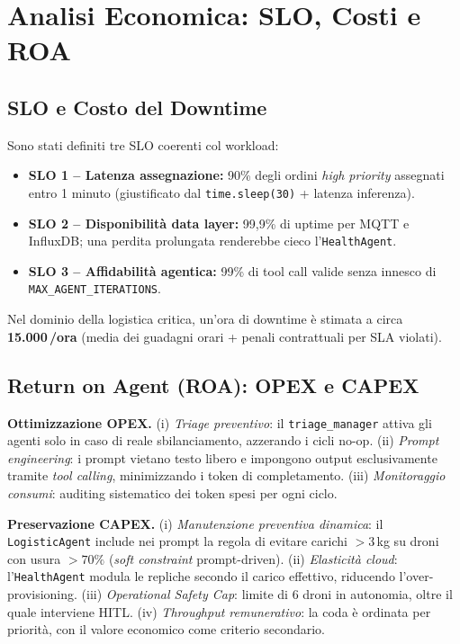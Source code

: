 
\chapter{Analisi Economica: SLO, Costi e ROA}
\label{cap:analisi_economica}

\section{SLO e Costo del Downtime}
\label{sec:slo_downtime}

Sono stati definiti tre SLO coerenti col workload:
\begin{itemize}
    \item \textbf{SLO 1 -- Latenza assegnazione:} 90\% degli ordini \textit{high priority} assegnati entro 1 minuto (giustificato dal \texttt{time.sleep(30)} + latenza inferenza).
    \item \textbf{SLO 2 -- Disponibilità data layer:} 99{,}9\% di uptime per MQTT e InfluxDB; una perdita prolungata renderebbe cieco l'\texttt{HealthAgent}.
    \item \textbf{SLO 3 -- Affidabilità agentica:} 99\% di tool call valide senza innesco di \texttt{MAX\_AGENT\_ITERATIONS}.
\end{itemize}

Nel dominio della logistica critica, un'ora di downtime è stimata a circa \textbf{15.000\,\texteuro/ora} (media dei guadagni orari + penali contrattuali per SLA violati).

\section{Return on Agent (ROA): OPEX e CAPEX}
\label{sec:roa}

\textbf{Ottimizzazione OPEX.} (i) \textit{Triage preventivo}: il \texttt{triage\_manager} attiva gli agenti solo in caso di reale sbilanciamento, azzerando i cicli no-op. (ii) \textit{Prompt engineering}: i prompt vietano testo libero e impongono output esclusivamente tramite \textit{tool calling}, minimizzando i token di completamento. (iii) \textit{Monitoraggio consumi}: auditing sistematico dei token spesi per ogni ciclo.

\textbf{Preservazione CAPEX.} (i) \textit{Manutenzione preventiva dinamica}: il \texttt{LogisticAgent} include nei prompt la regola di evitare carichi $>3$\,kg su droni con usura $>70\%$ (\textit{soft constraint} prompt-driven). (ii) \textit{Elasticità cloud}: l'\texttt{HealthAgent} modula le repliche secondo il carico effettivo, riducendo l'over-provisioning. (iii) \textit{Operational Safety Cap}: limite di 6 droni in autonomia, oltre il quale interviene HITL. (iv) \textit{Throughput remunerativo}: la coda è ordinata per priorità, con il valore economico come criterio secondario.

